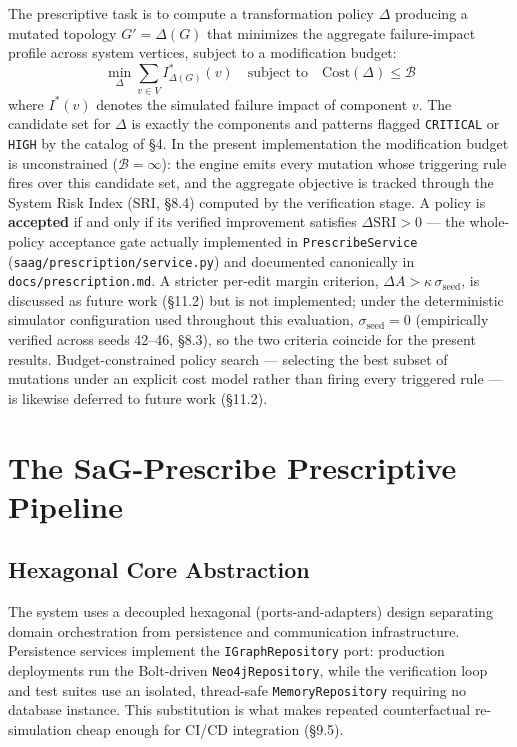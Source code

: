 \documentclass[11pt]{article}
\begin{document}
The prescriptive task is to compute a transformation policy $\Delta$ producing a mutated topology
$G' = \Delta(G)$ that minimizes the aggregate failure-impact profile across system vertices, subject
to a modification budget:
\begin{equation*}
\min_{\Delta} \sum_{v \in V} I^*_{\Delta(G)}(v) \quad \text{subject to} \quad \mathrm{Cost}(\Delta) \le \mathcal{B}
\end{equation*}
where $I^*(v)$ denotes the simulated failure impact of component $v$. The candidate set for $\Delta$
is exactly the components and patterns flagged \texttt{CRITICAL} or \texttt{HIGH} by the catalog of
\S4. In the present implementation the modification budget is unconstrained ($\mathcal{B} = \infty$):
the engine emits every mutation whose triggering rule fires over this candidate set, and the aggregate
objective is tracked through the System Risk Index (SRI, \S8.4) computed by the verification stage. A
policy is \textbf{accepted} if and only if its verified improvement satisfies $\Delta\mathrm{SRI} > 0$
--- the whole-policy acceptance gate actually implemented in \texttt{PrescribeService}
(\texttt{saag/prescription/service.py}) and documented canonically in \texttt{docs/prescription.md}. A
stricter per-edit margin criterion, $\Delta A > \kappa\,\sigma_{\text{seed}}$, is discussed as future
work (\S11.2) but is not implemented; under the deterministic simulator configuration used throughout
this evaluation, $\sigma_{\text{seed}} = 0$ (empirically verified across seeds 42--46, \S8.3), so the
two criteria coincide for the present results. Budget-constrained policy search --- selecting the best
subset of mutations under an explicit cost model rather than firing every triggered rule --- is
likewise deferred to future work (\S11.2).

\section{The SaG-Prescribe Prescriptive Pipeline}

\subsection{Hexagonal Core Abstraction}

The system uses a decoupled hexagonal (ports-and-adapters) design separating domain orchestration from
persistence and communication infrastructure. Persistence services implement the
\texttt{IGraphRepository} port: production deployments run the Bolt-driven \texttt{Neo4jRepository},
while the verification loop and test suites use an isolated, thread-safe \texttt{MemoryRepository}
requiring no database instance. This substitution is what makes repeated counterfactual re-simulation
cheap enough for CI/CD integration (\S9.5).
\end{document}
